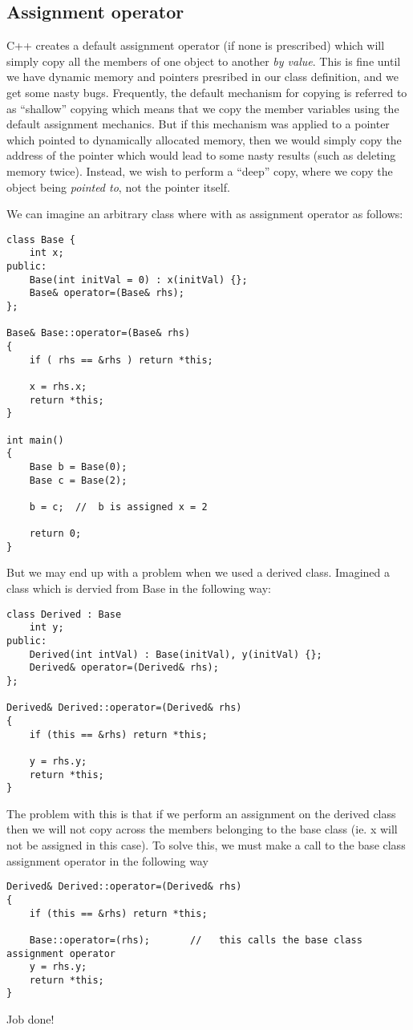 \subsection{Assignment operator}

C++ creates a default assignment operator (if none is prescribed) which will simply copy all the members of one object to another \emph{by value}. This is fine until we have dynamic memory and pointers presribed in our class definition, and we get some nasty bugs. Frequently, the default mechanism for copying is referred to as ``shallow'' copying which means that we copy the member variables using the default assignment mechanics. But if this mechanism was applied to a pointer which pointed to dynamically allocated memory, then we would simply copy the address of the pointer which would lead to some nasty results (such as deleting memory twice). Instead, we wish to perform a ``deep'' copy, where we copy the object being \emph{pointed to}, not the pointer itself.

We can imagine an arbitrary class where with as assignment operator as follows:
\begin{lstlisting}
class Base {
	int x;
public:
	Base(int initVal = 0) : x(initVal) {};
	Base& operator=(Base& rhs);
};

Base& Base::operator=(Base& rhs)
{
	if ( rhs == &rhs ) return *this;
	
	x = rhs.x;
	return *this;
} 

int main()
{
	Base b = Base(0);
	Base c = Base(2);
	
	b = c;	//	b is assigned x = 2
	
	return 0;
}
\end{lstlisting}

But we may end up with a problem when we used a derived class. Imagined a class which is dervied from Base in the following way:
\begin{lstlisting}
class Derived : Base 
	int y;
public:
	Derived(int intVal) : Base(initVal), y(initVal) {};
	Derived& operator=(Derived& rhs);
};

Derived& Derived::operator=(Derived& rhs)
{
	if (this == &rhs) return *this;
	
	y = rhs.y;
	return *this;
}
\end{lstlisting}
The problem with this is that if we perform an assignment on the derived class then we will not copy across the members belonging to the base class (ie. x will not be assigned in this case). To solve this, we must make a call to the base class assignment operator in the following way
\begin{lstlisting}
Derived& Derived::operator=(Derived& rhs) 
{
	if (this == &rhs) return *this;
	
	Base::operator=(rhs);		//	 this calls the base class assignment operator
	y = rhs.y;
	return *this;
}	
\end{lstlisting}
Job done!

